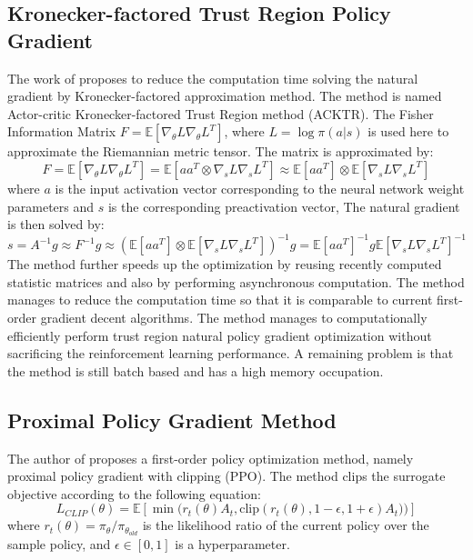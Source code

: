 \subsection{Kronecker-factored Trust Region Policy Gradient}
The work of \cite{wu2017scalable} proposes to reduce the computation time solving the natural gradient by Kronecker-factored approximation method. The method is named Actor-critic  Kronecker-factored Trust Region method (ACKTR).
The Fisher Information Matrix $F=\mathbb{E}[\nabla_\theta L \nabla_\theta L^T]$, where $L=\log\pi(a|s)$ is used here to approximate the Riemannian metric tensor.
The matrix is approximated by:
\begin{equation*}
    F=\mathbb{E}[\nabla_\theta L \nabla_\theta L^T] = \mathbb{E}[aa^T \otimes \nabla_s L \nabla_s L^T ] 
    \approx \mathbb{E}[aa^T] \otimes \mathbb{E}[\nabla_s L \nabla_s L^T ] 
\end{equation*}
where $a$ is the input activation vector corresponding to the neural network weight parameters and $s$ is the corresponding preactivation vector,
The natural gradient is then solved by:
\begin{equation}
    s=A^{-1}g \approx F^{-1}g \approx \left(\mathbb{E}[aa^T] \otimes \mathbb{E}[\nabla_s L \nabla_s L^T ] \right)^{-1}g = \mathbb{E}[aa^T]^{-1} g  \mathbb{E}[\nabla_s L \nabla_s L^T ]^{-1}
\end{equation}
The method further speeds up the optimization by reusing recently computed statistic matrices and also by performing asynchronous computation. The method manages to reduce the computation time so that it is comparable to current first-order gradient decent algorithms.
The method manages to computationally efficiently perform trust region natural policy gradient optimization without sacrificing the reinforcement learning performance. A remaining problem is that the method is still batch based and has a high memory occupation.

\subsection{Proximal Policy Gradient Method}
The author of \cite{schulman2017proximal} proposes a first-order policy optimization method, namely proximal policy gradient with clipping (PPO). The method clips the surrogate objective according to the following equation:
\begin{equation}
    L_{CLIP}(\theta) = \mathbb{E} \left[ \min\big(r_t(\theta) A_t , \mathrm{clip}(r_t(\theta),1-\epsilon,1+\epsilon)A_t)\big) \right]
\end{equation}
where $r_t(\theta) = \pi_\theta / \pi_{\theta_{old}}$ is the likelihood ratio of the current policy over the sample policy, and $\epsilon \in [0,1]$ is a hyperparameter. 

